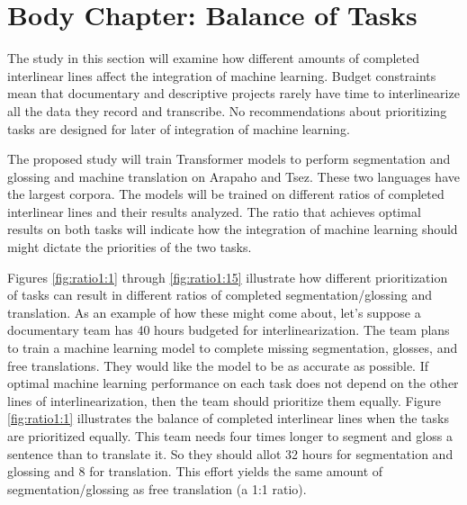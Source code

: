 \section{Body Chapter: Balance of Tasks}
\label{sec:balance}

The study in this section will examine how different amounts of completed interlinear lines affect the integration of machine learning. Budget constraints mean that documentary and descriptive projects rarely have time to interlinearize all the data they record and transcribe. No recommendations about prioritizing tasks are designed for later of integration of machine learning. 

The proposed study will train Transformer models to perform segmentation and glossing and machine translation on Arapaho and Tsez. These two languages have the largest corpora. The models will be trained on different ratios of completed interlinear lines and their results analyzed. The ratio that achieves optimal results on both tasks will indicate how the integration of machine learning should might dictate the priorities of the two tasks.

Figures \ref{fig:ratio1:1} through \ref{fig:ratio1:15} illustrate how different prioritization of tasks can result in different ratios of completed segmentation/glossing and translation. As an example of how these might come about, let's suppose a documentary team has 40 hours budgeted for interlinearization. The team plans to train a machine learning model to complete missing segmentation, glosses, and free translations. They would like the model to be as accurate as possible. If optimal machine learning performance on each task does not depend on the other lines of interlinearization, then the team should prioritize them equally. Figure \ref{fig:ratio1:1} illustrates the balance of completed interlinear lines when the tasks are prioritized equally. This team needs four times longer to segment and gloss a sentence than to translate it. So they should allot 32 hours for segmentation and glossing and 8 for translation. %
This effort yields the same amount of segmentation/glossing as free translation (a 1:1 ratio).

